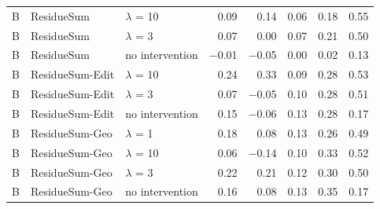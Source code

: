 \begin{longtable}{llp{3.3cm}rrrrr}
B & ResidueSum & $\lambda$ = 10 & 0.09 & 0.14 & 0.06 & 0.18 & 0.55 \\
B & ResidueSum & $\lambda$ = 3 & 0.07 & 0.00 & 0.07 & 0.21 & 0.50 \\
B & ResidueSum & no intervention & $-$0.01 & $-$0.05 & 0.00 & 0.02 & 0.13 \\
B & ResidueSum-Edit & $\lambda$ = 10 & 0.24 & 0.33 & 0.09 & 0.28 & 0.53 \\
B & ResidueSum-Edit & $\lambda$ = 3 & 0.07 & $-$0.05 & 0.10 & 0.28 & 0.51 \\
B & ResidueSum-Edit & no intervention & 0.15 & $-$0.06 & 0.13 & 0.28 & 0.17 \\
B & ResidueSum-Geo & $\lambda$ = 1 & 0.18 & 0.08 & 0.13 & 0.26 & 0.49 \\
B & ResidueSum-Geo & $\lambda$ = 10 & 0.06 & $-$0.14 & 0.10 & 0.33 & 0.52 \\
B & ResidueSum-Geo & $\lambda$ = 3 & 0.22 & 0.21 & 0.12 & 0.30 & 0.50 \\
B & ResidueSum-Geo & no intervention & 0.16 & 0.08 & 0.13 & 0.35 & 0.17 \\
\bottomrule
\end{longtable}
